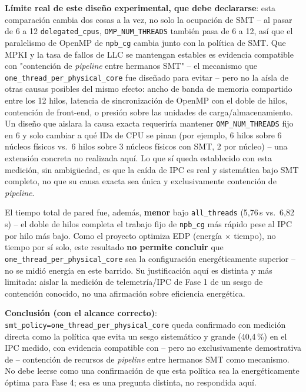 \textbf{Límite real de este diseño experimental, que debe declararse}:
esta comparación cambia dos cosas a la vez, no solo la ocupación de SMT --
al pasar de 6 a 12 \texttt{delegated\_cpus}, \texttt{OMP\_NUM\_THREADS}
también pasa de 6 a 12, así que el paralelismo de OpenMP de \texttt{npb\_cg}
cambia junto con la política de SMT. Que MPKI y la tasa de fallos de LLC
se mantengan estables es evidencia compatible con "contención de
\textit{pipeline} entre hermanos SMT" -- el mecanismo que
\texttt{one\_thread\_per\_physical\_core} fue diseñado para evitar -- pero
no la aísla de otras causas posibles del mismo efecto: ancho de banda de
memoria compartido entre los 12 hilos, latencia de sincronización de
OpenMP con el doble de hilos, contención de front-end, o presión sobre las
unidades de carga/almacenamiento. Un diseño que aislara la causa exacta
requeriría mantener \texttt{OMP\_NUM\_THREADS} fijo en 6 y solo cambiar a
qué IDs de CPU se pinan (por ejemplo, 6 hilos sobre 6 núcleos físicos vs.\
6 hilos sobre 3 núcleos físicos con SMT, 2 por núcleo) -- una extensión
concreta no realizada aquí. Lo que sí queda establecido con esta medición,
sin ambigüedad, es que la caída de IPC es real y sistemática bajo SMT
completo, no que su causa exacta sea única y exclusivamente contención de
\textit{pipeline}.

El tiempo total de pared fue, además, \textbf{menor} bajo
\texttt{all\_threads} (5{,}76\,s vs.\ 6{,}82\,s) -- el doble de hilos
completa el trabajo fijo de \texttt{npb\_cg} más rápido pese al IPC por
hilo más bajo. Como el proyecto optimiza EDP (energía $\times$ tiempo), no
tiempo por sí solo, este resultado \textbf{no permite concluir} que
\texttt{one\_thread\_per\_physical\_core} sea la configuración
energéticamente superior -- no se midió energía en este barrido. Su
justificación aquí es distinta y más limitada: aislar la medición de
telemetría/IPC de Fase 1 de un sesgo de contención conocido, no una
afirmación sobre eficiencia energética.

\textbf{Conclusión (con el alcance correcto)}: \texttt{smt\_policy=one\_thread\_per\_physical\_core}
queda confirmado con medición directa como la política que evita un sesgo
sistemático y grande (40{,}4\,\%) en el IPC medido, con evidencia compatible
con -- pero no exclusivamente demostrativa de -- contención de recursos de
\textit{pipeline} entre hermanos SMT como mecanismo. No debe leerse como
una confirmación de que esta política sea la energéticamente óptima para
Fase 4; esa es una pregunta distinta, no respondida aquí.
